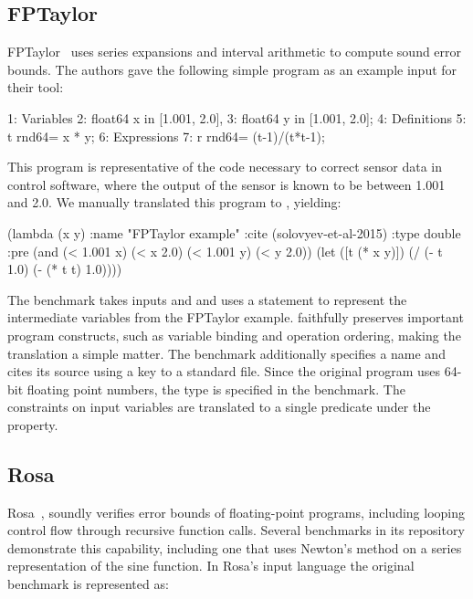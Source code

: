 \documentclass[main.tex]{subfiles}
\begin{document}
\subsection{FPTaylor}


FPTaylor~\cite{fptaylor-fm15} uses series expansions and interval
arithmetic to compute sound error bounds. The authors gave the following
simple program as an example input for their tool:

\begin{code}
1: Variables
2:   float64 x in [1.001, 2.0],
3:   float64 y in [1.001, 2.0];
4: Definitions
5:   t rnd64= x * y;
6: Expressions
7:   r rnd64= (t-1)/(t*t-1);
\end{code}

This program is representative of the code necessary to correct sensor data
in control software, where the output of the sensor is known to be between
1.001 and 2.0. We manually translated this program to \core, yielding:

\begin{code}
(lambda (x y)
  :name "FPTaylor example"
  :cite (solovyev-et-al-2015)
  :type double
  :pre (and (< 1.001 x) (< x 2.0) (< 1.001 y) (< y 2.0))
  (let ([t (* x y)])
    (/ (- t 1.0)  (- (* t t) 1.0))))
\end{code}

The benchmark takes inputs  and 
  and uses a  statement to represent the intermediate variables
  from the FPTaylor example.
\core faithfully preserves important program constructs,
  such as variable binding and operation ordering,
  making the translation a simple matter.
The benchmark additionally specifies a name
  and cites its source using a key to a standard \BibTeX{} file.
Since the original program uses 64-bit floating point numbers,
  the type  is specified in the benchmark.
The constraints on input variables are translated to
  a single predicate under the  property.


\subsection{Rosa}

Rosa~\cite{DarulovaK14}, soundly verifies error bounds of floating-point
programs, including looping control flow through recursive function calls.
Several benchmarks in its repository demonstrate this capability, including
one that uses Newton's method on a series representation of the sine
function.  In Rosa's input language the original benchmark is represented
as:
\end{document}
